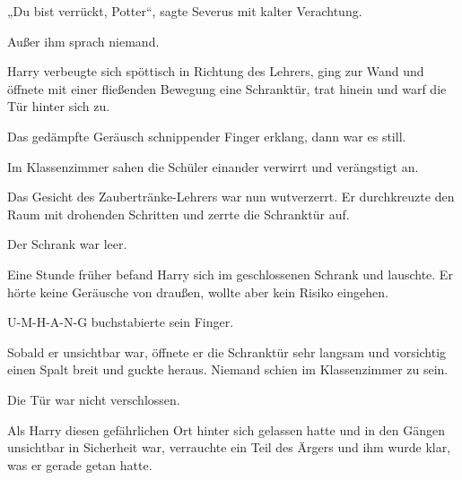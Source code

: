 „Du bist verrückt, Potter“, sagte Severus mit kalter Verachtung. 

Außer ihm sprach niemand. 

Harry verbeugte sich spöttisch in Richtung des Lehrers, ging zur Wand und öffnete mit einer fließenden Bewegung eine Schranktür, trat hinein und warf die Tür hinter sich zu. 

Das gedämpfte Geräusch schnippender Finger erklang, dann war es still. 

Im Klassenzimmer sahen die Schüler einander verwirrt und verängstigt an. 

Das Gesicht des Zaubertränke-Lehrers war nun wutverzerrt. Er durchkreuzte den Raum mit drohenden Schritten und zerrte die Schranktür auf. 

Der Schrank war leer. 

\later

Eine Stunde früher befand Harry sich im geschlossenen Schrank und lauschte. Er hörte keine Geräusche von draußen, wollte aber kein Risiko eingehen. 

U-M-H-A-N-G buchstabierte sein Finger. 

Sobald er unsichtbar war, öffnete er die Schranktür sehr langsam und vorsichtig einen Spalt breit und guckte heraus. Niemand schien im Klassenzimmer zu sein. 

Die Tür war nicht verschlossen. 

Als Harry diesen gefährlichen Ort hinter sich gelassen hatte und in den Gängen unsichtbar in Sicherheit war, verrauchte ein Teil des Ärgers und ihm wurde klar, was er gerade getan hatte. 


